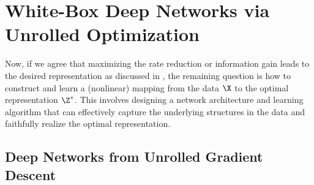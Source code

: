 \documentclass[../../book-main.tex]{subfiles}
\begin{document}




\section{White-Box Deep Networks via Unrolled Optimization}\label{sec:chap4-white-box-model-via-unrolling}


Now, if we agree that maximizing the rate reduction or information gain leads to the desired representation as discussed in , the remaining question is how to construct and learn a (nonlinear) mapping from the data $\X$ to the optimal representation $\Z^*$. This involves designing a network architecture and learning algorithm that can effectively capture the underlying structures in the data and faithfully realize the optimal representation. 


\subsection{Deep Networks from Unrolled Gradient Descent}
\end{document}
